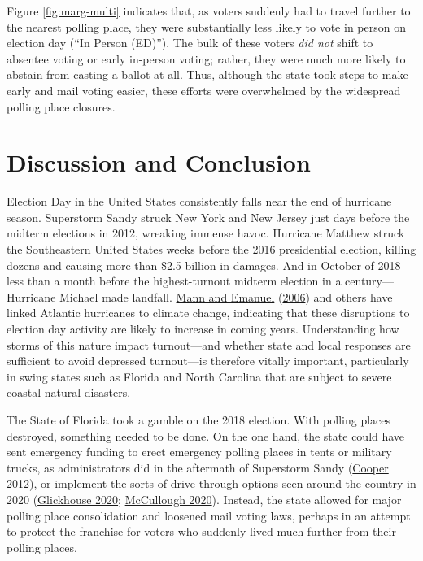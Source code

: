 \documentclass[
  12pt,
]{article}
\begin{document}
Figure \ref{fig:marg-multi} indicates that, as voters suddenly had to travel further to the nearest polling place, they were substantially less likely to vote in person on election day (``In Person (ED)''). The bulk of these voters \emph{did not} shift to absentee voting or early in-person voting; rather, they were much more likely to abstain from casting a ballot at all. Thus, although the state took steps to make early and mail voting easier, these efforts were overwhelmed by the widespread polling place closures.

\hypertarget{discussion-and-conclusion}{%
\section*{Discussion and Conclusion}\label{discussion-and-conclusion}}

Election Day in the United States consistently falls near the end of hurricane season. Superstorm Sandy struck New York and New Jersey just days before the midterm elections in 2012, wreaking immense havoc. Hurricane Matthew struck the Southeastern United States weeks before the 2016 presidential election, killing dozens and causing more than \$2.5 billion in damages. And in October of 2018---less than a month before the highest-turnout midterm election in a century---Hurricane Michael made landfall. \protect\hyperlink{ref-Mann2006}{Mann and Emanuel} (\protect\hyperlink{ref-Mann2006}{2006}) and others have linked Atlantic hurricanes to climate change, indicating that these disruptions to election day activity are likely to increase in coming years. Understanding how storms of this nature impact turnout---and whether state and local responses are sufficient to avoid depressed turnout---is therefore vitally important, particularly in swing states such as Florida and North Carolina that are subject to severe coastal natural disasters.

The State of Florida took a gamble on the 2018 election. With polling places destroyed, something needed to be done. On the one hand, the state could have sent emergency funding to erect emergency polling places in tents or military trucks, as administrators did in the aftermath of Superstorm Sandy (\protect\hyperlink{ref-Cooper2012}{Cooper 2012}), or implement the sorts of drive-through options seen around the country in 2020 (\protect\hyperlink{ref-Glickhouse2020}{Glickhouse 2020}; \protect\hyperlink{ref-McCullough2020}{McCullough 2020}). Instead, the state allowed for major polling place consolidation and loosened mail voting laws, perhaps in an attempt to protect the franchise for voters who suddenly lived much further from their polling places.
\end{document}
